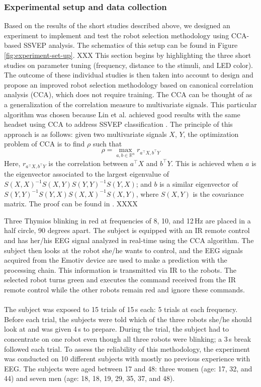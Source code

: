 \documentclass[smallextended]{svjour3}
\begin{document}
\subsubsection{Experimental setup and data collection}
Based on the results of the short studies described above, we designed an experiment to implement and test the robot selection methodology using CCA-based SSVEP analysis. The schematics of this setup can be found in Figure \ref{fig:experiment-set-up}.
XXX
This section begins by highlighting the three short studies on parameter tuning (frequency, distance to the stimuli, and LED color). The outcome of these individual studies is then taken into account to design and propose an improved robot selection methodology based on canonical correlation analysis (CCA), which does not require training. 
The CCA can be thought of as a generalization of the correlation measure to multivariate signals. 
This particular algorithm was chosen because Lin et al. achieved good results with the same headset using CCA to address SSVEP classification \cite{Lin2014}. The principle of this approach is as follows: given two multivariate signals $X$, $Y$, the optimization problem of CCA is to find $\rho$ such that
\\
\begin{equation}
\label{rho}
\rho = \max_{a, b \in \mathbb R^n} r_{ a^\top X, b^\top Y}
\end{equation}
Here, $r_{a^\top X, b^\top Y}$ is the correlation between $a^\top X$ and $b^\top Y$. This is achieved when $a$ is the eigenvector associated to the largest eigenvalue of $S(X, X)^{-1} S(X,Y) S(Y, Y)^{-1} S(Y, X)$; and $b$ is a similar eigenvector of $S(Y, Y)^{-1} S(Y, X) S(X, X)^{-1} S(X, Y)$, where $S(X, Y)$ is the covariance matrix. The proof can be found in \cite{rencher2003}.
XXXX


Three Thymios blinking in red at frequencies of 8, 10, and 12\,Hz are placed in a half circle, 90 degrees apart.
The subject is equipped with an IR remote control and has her/his EEG signal analyzed in real-time using the CCA algorithm.
The subject then looks at the robot she/he wants to control, and the EEG signals acquired from the Emotiv device are used to make a prediction with the processing chain.
This information is transmitted via IR to the robots.
The selected robot turns green and executes the command received from the IR remote control while the other robots remain red and ignore these commands.\\
\\
The subject was exposed to 15 trials of 15\,s each: 5 trials at each frequency. Before each trial, the subjects were told which of the three robots she/he should look at and was given 4\,s to prepare. During the trial, the subject had to concentrate on one robot even though all three robots were blinking; a 3\,s break followed each trial.
To assess the reliability of this methodology, the experiment was conducted on 10 different subjects with mostly no previous experience with EEG.
The subjects were aged between 17 and 48: three women (age: 17, 32, and 44) and seven men (age: 18, 18, 19, 29, 35, 37, and 48). 
\end{document}
